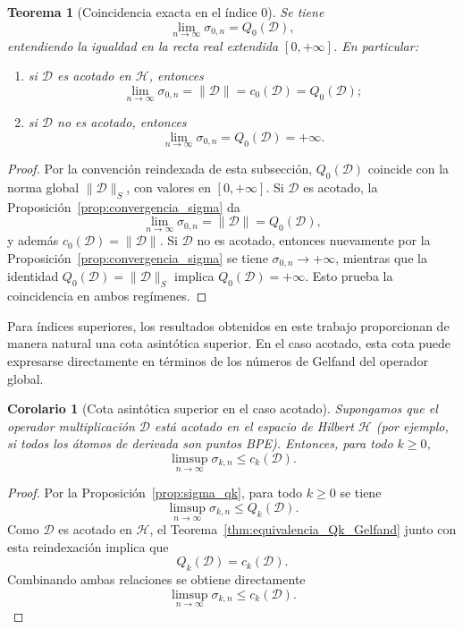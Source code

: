 \documentclass[12pt,a4paper]{article}
\newtheorem{theorem}{Teorema}
\newtheorem{corollary}{Corolario}
\theoremstyle{definition}
\theoremstyle{remark}
\begin{document}
\begin{theorem}[Coincidencia exacta en el índice $0$]\label{thm:sigma1_q1_extendido}
	Se tiene
	\[
		\lim_{n \to \infty} \sigma_{0,n} = Q_0(\mathcal{D}),
	\]
	entendiendo la igualdad en la recta real extendida $[0,+\infty]$. En particular:
	\begin{enumerate}
		\item si $\mathcal{D}$ es acotado en $\mathcal{H}$, entonces
		      \[
			      \lim_{n \to \infty} \sigma_{0,n} = \|\mathcal{D}\| = c_0(\mathcal{D}) = Q_0(\mathcal{D});
		      \]
		\item si $\mathcal{D}$ no es acotado, entonces
		      \[
			      \lim_{n \to \infty} \sigma_{0,n} = Q_0(\mathcal{D}) = +\infty.
		      \]
	\end{enumerate}
\end{theorem}

\begin{proof}
	Por la convención reindexada de esta subsección, $Q_0(\mathcal{D})$ coincide con la norma global $\|\mathcal{D}\|_S$, con valores en $[0,+\infty]$. Si $\mathcal{D}$ es acotado, la Proposición~\ref{prop:convergencia_sigma} da
	\[
		\lim_{n \to \infty} \sigma_{0,n} = \|\mathcal{D}\| = Q_0(\mathcal{D}),
	\]
	y además $c_0(\mathcal{D}) = \|\mathcal{D}\|$. Si $\mathcal{D}$ no es acotado, entonces nuevamente por la Proposición~\ref{prop:convergencia_sigma} se tiene $\sigma_{0,n} \to +\infty$, mientras que la identidad $Q_0(\mathcal{D}) = \|\mathcal{D}\|_S$ implica $Q_0(\mathcal{D}) = +\infty$. Esto prueba la coincidencia en ambos regímenes.
\end{proof}

Para índices superiores, los resultados obtenidos en este trabajo proporcionan de manera natural una cota asintótica superior. En el caso acotado, esta cota puede expresarse directamente en términos de los números de Gelfand del operador global.

\begin{corollary}[Cota asintótica superior en el caso acotado]\label{cor:convergencia_qk_condicional}
	Supongamos que el operador multiplicación $\mathcal{D}$ está acotado en el espacio de Hilbert $\mathcal{H}$ (por ejemplo, si todos los átomos de derivada son puntos BPE). Entonces, para todo $k \ge 0$,
	\[
		\limsup_{n \to \infty} \sigma_{k,n} \le c_k(\mathcal{D}).
	\]
\end{corollary}

\begin{proof}
	Por la Proposición~\ref{prop:sigma_qk}, para todo $k \ge 0$ se tiene
	\[
		\limsup_{n \to \infty} \sigma_{k,n} \le Q_k(\mathcal{D}).
	\]
	Como $\mathcal{D}$ es acotado en $\mathcal{H}$, el Teorema~\ref{thm:equivalencia_Qk_Gelfand} junto con esta reindexación implica que
	\[
		Q_k(\mathcal{D}) = c_k(\mathcal{D}).
	\]
	Combinando ambas relaciones se obtiene directamente
	\[
		\limsup_{n \to \infty} \sigma_{k,n} \le c_k(\mathcal{D}).
	\]
\end{proof}
\end{document}
